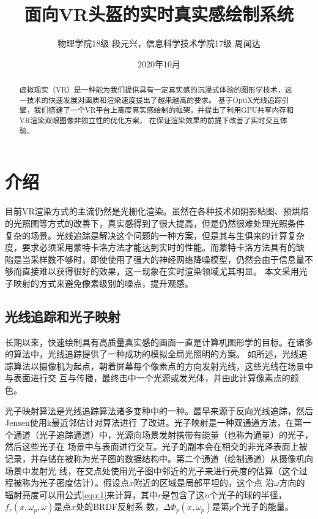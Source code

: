 \documentclass[UTF8]{ctexart}
\title{面向VR头盔的实时真实感绘制系统}
\author{\fontsize{10.0pt}{\baselineskip}\selectfont 物理学院18级 段元兴，信息科学技术学院17级 周闻达}
\date{2020年10月}
\begin{document}
\maketitle
\begin{abstract}
    虚拟现实（VR）是一种能为我们提供具有一定真实感的沉浸式体验的图形学技术，这一技术的快速发展对画质和渲染速度提出了越来越高的要求。
    基于OptiX光线追踪引擎，我们搭建了一个VR平台上高度真实感绘制的框架，并提出了利用GPU共享内存和VR渲染双眼图像非独立性的优化方案，
    在保证渲染效果的前提下改善了实时交互体验。
\end{abstract}

\section{介绍}
    目前VR渲染方式的主流仍然是光栅化渲染。虽然在各种技术如阴影贴图、预烘焙的光照图等方式的改善下，真实感得到了很大提高，但是仍然很难处理光照条件
    复杂的场景。光线追踪是解决这个问题的一种方案，但是其与生俱来的计算复杂度，要求必须采用蒙特卡洛方法才能达到实时的性能。而蒙特卡洛方法具有的缺
    陷是当采样数不够时，即使使用了强大的神经网络降噪模型，仍然会由于信息量不够而直接难以获得很好的效果，这一现象在实时渲染领域尤其明显。
    本文采用光子映射的方式来避免像素级别的噪点，提升观感。
    \subsection{光线追踪和光子映射}
        长期以来，快速绘制具有高质量真实感的画面一直是计算机图形学的目标。在诸多的算法中，光线追踪提供了一种成功的模拟全局光照明的方案。
        如\cite{GlobalIllumination}所述，光线追踪算法以摄像机为起点，朝着屏幕每个像素点的方向发射光线，这些光线在场景中与表面进行交
        互与传播，最终击中一个光源或发光体，并由此计算像素点的颜色。
        
        光子映射算法是光线追踪算法诸多变种中的一种。最早来源于反向光线追踪\cite{ARVO1986Backward}，然后Jensen使用k最近邻估计对算法进行
        了改进\cite{Jensen1996Global}。光子映射是一种双通道方法，在第一个通道（光子追踪通道）中，光源向场景发射携带有能量（也称为通量）的光子，然后这些光子在
        场景中与表面进行交互。光子的副本会在相交的非光泽表面上被记录，并存储在被称为光子图的数据结构中。第二个通道（绘制通道）从摄像机向场景中发射光
        线，在交点处使用光子图中邻近的光子来进行亮度的估算（这个过程被称为光子密度估计）。假设点$x$附近的区域是局部平坦的，这个点
        沿$\omega$方向的辐射亮度可以用公式\ref{equ:1}来计算，其中$r$是包含了这$n$个光子的球的半径，$f_r(x,\omega_p,\omega)$是点$x$处的BRDF反射系
        数，$\Delta\Phi_p(x,\omega_p)$是第$p$个光子的能量。
        
\end{document}

